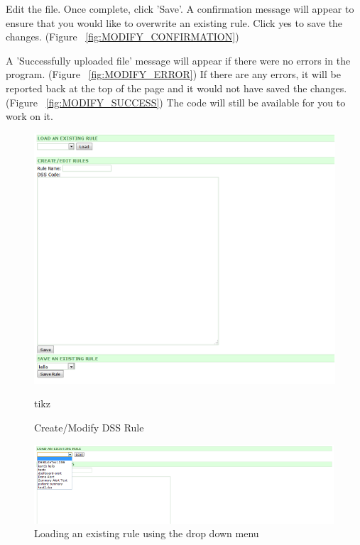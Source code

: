 \documentclass[12pt,letterpaper]{article}
\begin{document}
Edit the file. Once complete, click 'Save'. A confirmation message will appear to ensure that you would like to overwrite an existing rule. Click yes to save the changes.
(Figure ~\ref{fig:MODIFY_CONFIRMATION})

A 'Successfully uploaded file' message will appear if there were no errors in the program. 
(Figure ~\ref{fig:MODIFY_ERROR})
If there are any errors, it will be reported back at the top of the page and it would not have saved the changes. 
(Figure ~\ref{fig:MODIFY_SUCCESS})
The code will still be available for you to work on it.

\begin{figure}\begin{center}
\includegraphics[width=6.5in]{user_guide/create_modify.png}
\end{center}
\caption{Create/Modify DSS Rule}
\label{fig:CREATE_MODIFY}tikz
\end{figure}

\begin{figure}\begin{center}
\includegraphics[width=6.5in]{user_guide/load_rule.png}
\end{center}
\caption{Loading an existing rule using the drop down menu}
\label{fig:LOAD_RULE}
\end{figure}
\end{document}
